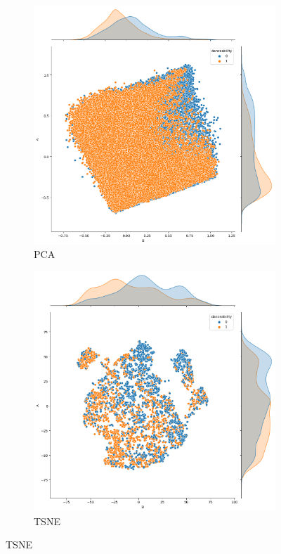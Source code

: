 \documentclass{wsdcr}
\begin{document}
\begin{figure}[H]
    \centering

    \begin{subfigure}[b]{0.3\columnwidth} \includegraphics[width=\columnwidth]{images/PCA.png} \caption{PCA} \label{fig:PCA} \end{subfigure}
    \hfill
    \begin{subfigure}[b]{0.3\columnwidth} \includegraphics[width=\columnwidth]{images/TSNE.png} \caption{TSNE} \label{fig:TSNE} \end{subfigure}

\end{figure}
\end{document}
